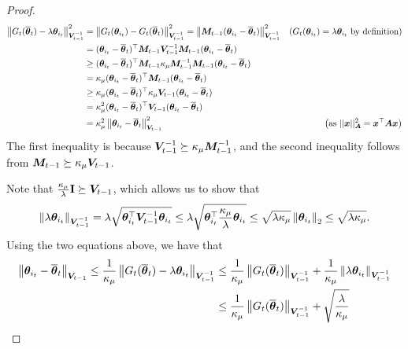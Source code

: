 \begin{proof}
\begin{align*}
    \left\| G_t(\overline{\boldsymbol{\theta}}_t) - \lambda \boldsymbol{\theta}_{i_t} \right\|_{\boldsymbol{V}_{t-1}^{-1}}^2 &=  \left\| G_t(\boldsymbol{\theta}_{i_t}) - G_t(\overline{\boldsymbol{\theta}}_t) \right\|_{\boldsymbol{V}_{t-1}^{-1}}^2 = \left\| \boldsymbol{M}_{t-1} (\boldsymbol{\theta}_{i_t} - \overline{\boldsymbol{\theta}}_t) \right\|_{\boldsymbol{V}_{t-1}^{-1}}^2 & \left( G_t(\boldsymbol{\theta}_{i_t}) = \lambda \boldsymbol{\theta}_{i_t} \text{ by definition} \right)\\
    & = (\boldsymbol{\theta}_{i_t} - \overline{\boldsymbol{\theta}}_t)^{\top} \boldsymbol{M}_{t-1} \boldsymbol{V}_{t-1}^{-1} \boldsymbol{M}_{t-1} (\boldsymbol{\theta}_{i_t} - \overline{\boldsymbol{\theta}}_t)\\
    &\geq (\boldsymbol{\theta}_{i_t} - \overline{\boldsymbol{\theta}}_t)^{\top} \boldsymbol{M}_{t-1} \kappa_\mu \boldsymbol{M}_{t-1}^{-1} \boldsymbol{M}_{t-1} (\boldsymbol{\theta}_{i_t} - \overline{\boldsymbol{\theta}}_t)\\
    & = \kappa_\mu(\boldsymbol{\theta}_{i_t} - \overline{\boldsymbol{\theta}}_t)^{\top} \boldsymbol{M}_{t-1} (\boldsymbol{\theta}_{i_t} - \overline{\boldsymbol{\theta}}_t)\\
    & \geq \kappa_\mu(\boldsymbol{\theta}_{i_t} - \overline{\boldsymbol{\theta}}_t)^{\top} \kappa_\mu \boldsymbol{V}_{t-1} (\boldsymbol{\theta}_{i_t} - \overline{\boldsymbol{\theta}}_t)\\
    & = \kappa_\mu^2 (\boldsymbol{\theta}_{i_t} - \overline{\boldsymbol{\theta}}_t)^{\top} \boldsymbol{V}_{t-1} (\boldsymbol{\theta}_{i_t} - \overline{\boldsymbol{\theta}}_t)\\
    & = \kappa_\mu^2 \left\| \boldsymbol{\theta}_{i_t} - \overline{\boldsymbol{\theta}}_t \right\|^2_{\boldsymbol{V}_{t-1}}  & \left(\text{as } ||\boldsymbol{x}||_{\boldsymbol{A}}^2 = \boldsymbol{x}^\top \boldsymbol{A} \boldsymbol{x} \right)
\end{align*}
The first inequality is because $\boldsymbol{V}^{-1}_{t-1} \succeq \kappa_\mu \boldsymbol{M}^{-1}_{t-1}$, and the second inequality follows from $\boldsymbol{M}_{t-1} \succeq \kappa_\mu \boldsymbol{V}_{t-1}$.

Note that $\frac{\kappa_\mu}{\lambda} \mathbf{I}\succeq\boldsymbol{V}_{t-1}$, which allows us to show that
\begin{equation}
\begin{split}
\left\| \lambda \boldsymbol{\theta}_{i_t} \right\|_{\boldsymbol{V}_{t-1}^{-1}} = \lambda \sqrt{ \boldsymbol{\theta}_{i_t}^{\top} \boldsymbol{V}_{t-1}^{-1} \boldsymbol{\theta}_{i_t}} \leq \lambda \sqrt{ \boldsymbol{\theta}_{i_t}^{\top} \frac{\kappa_\mu}{\lambda} \boldsymbol{\theta}_{i_t}} \leq \sqrt{\lambda\kappa_\mu} \left\| \boldsymbol{\theta}_{i_t} \right\|_2 \leq \sqrt{\lambda\kappa_\mu}.
\end{split}
\end{equation}
Using the two equations above, we have that
\begin{equation}
\begin{split}
\left\| \boldsymbol{\theta}_{i_t} - \overline{\boldsymbol{\theta}}_t \right\|_{\boldsymbol{V}_{t-1}} \le \frac{1}{\kappa_\mu} \left\| G_t(\overline{\boldsymbol{\theta}}_t) - \lambda \boldsymbol{\theta}_{i_t} \right\|_{\boldsymbol{V}_{t-1}^{-1}} &\leq \frac{1}{\kappa_\mu} \left\| G_t(\overline{\boldsymbol{\theta}}_t) \right\|_{\boldsymbol{V}_{t-1}^{-1}} + \frac{1}{\kappa_\mu}\left\| \lambda \boldsymbol{\theta}_{i_t} \right\|_{\boldsymbol{V}_{t-1}^{-1}} \\
&\leq \frac{1}{\kappa_\mu} \left\| G_t(\overline{\boldsymbol{\theta}}_t) \right\|_{\boldsymbol{V}_{t-1}^{-1}} + \sqrt{\frac{\lambda}{\kappa_\mu}}
\end{split}
\end{equation}


\end{proof}
